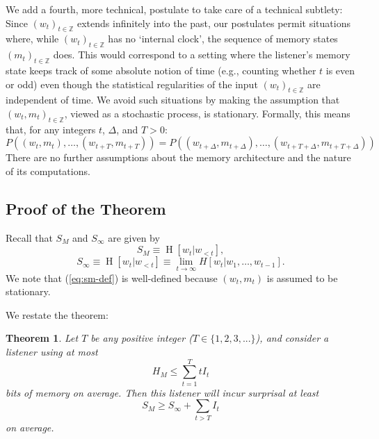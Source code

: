 \documentclass[11pt,letterpaper]{article}
\newcounter{theorem}
\newtheorem{thm}[theorem]{Theorem}
\begin{document}
We add a fourth, more technical, postulate to take care of a technical subtlety:
Since $(w_t)_{t \in \mathbb{Z}}$ extends infinitely into the past, our postulates permit situations where, while $(w_t)_{t \in \mathbb{Z}}$ has no `internal clock', the sequence of memory states $(m_t)_{t \in \mathbb{Z}}$ does.
This would correspond to a setting where the listener's memory state keeps track of some absolute notion of time (e.g., counting whether $t$ is even or odd) even though the statistical regularities of the input $(w_t)_{t \in \mathbb{Z}}$ are independent of time.
We avoid such situations by making the assumption that $(w_t, m_t)_{t \in \mathbb{Z}}$, viewed as a stochastic process, is stationary.
Formally, this means that, for any integers $t$, $\Delta$, and $T>0$:
\begin{equation}
	P((w_t, m_t), \dots, (w_{t+T}, m_{t+T})) = 	P((w_{t+\Delta}, m_{t+\Delta}), \dots, (w_{t+T+\Delta}, m_{t+T+\Delta}))
\end{equation}
There are no further assumptions about the memory architecture and the nature of its computations.



\subsection{Proof of the Theorem}\label{sec:proof}


	Recall that $S_M$ and $S_\infty$ are given by
	\begin{equation}\label{eq:sm-def}
		    S_M \equiv \operatorname{H}[w_t|w_{<t}],
	\end{equation}
	\begin{equation}
		S_\infty \equiv \operatorname{H}[w_t|w_{<t}] \equiv \lim_{t \rightarrow \infty} H[w_t | w_1, \dots, w_{t-1}].
	\end{equation}
We note that (\ref{eq:sm-def}) is well-defined because $(w_t, m_t)$ is assumed to be stationary.

We restate the theorem:

\begin{thm}\label{prop:suboptimal}
	Let $T$ be any positive integer ($T \in \{1, 2, 3, ...\}$), and consider a listener using at most
	\begin{equation}\label{eq:memory}
H_M \leq \sum_{t=1}^T t I_t
	\end{equation}
bits of memory on average.
Then this listener will incur surprisal at least
	\begin{equation}
	S_M \geq S_\infty + \sum_{t > T} I_t
	\end{equation}
	on average.
\end{thm}
\end{document}
